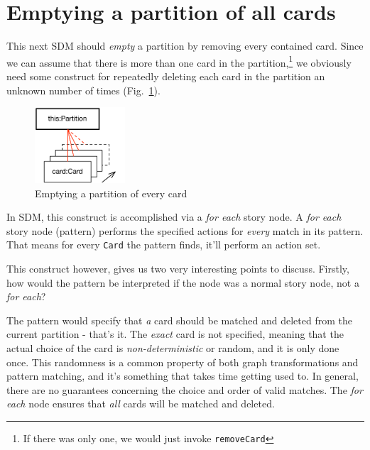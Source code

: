 \newpage
\hypertarget{sec:emptyPartition}{}
\section{Emptying a partition of all cards}
\genHeader

This next SDM should \emph{empty} a partition by removing every contained card. Since we can assume that there is more than one card in the
partition,\footnote{If there was only one, we would just invoke \texttt{removeCard}} we obviously need some construct for repeatedly deleting each card in the
partition an unknown number of times (Fig.~\ref{fig:goal_empty}). 

\vspace{0.5cm}

\begin{figure}[htbp]
	\centering
  \includegraphics[width=0.3\textwidth]{goal_partitionEmpty.pdf}
	\caption{Emptying a partition of every card}
	\label{fig:goal_empty}
\end{figure}
\FloatBarrier

\vspace{0.5cm}

In SDM, this  construct is accomplished via a \emph{for each} story node. A
\emph{for each} story node (pattern) performs the specified actions for \emph{every} match in its pattern. That means for every \texttt{Card} the pattern
finds, it'll perform an action set.

This construct however, gives us two very interesting points to discuss. Firstly, how would the pattern be interpreted if the node was a normal story node, not
a \emph{for each}?

The pattern would specify that \emph{a} card should be matched and deleted from the current partition - that's it. The \emph{exact} card is not specified,
meaning that the actual choice of the card is \emph{non-deterministic} or random, and it is only done once. This randomness is a common property of both graph
transformations and pattern matching, and it's something that takes time getting used to.  In general, there are no guarantees concerning the choice and
order of valid matches. The \emph{for each} node ensures that \emph{all} cards will be matched and deleted.

